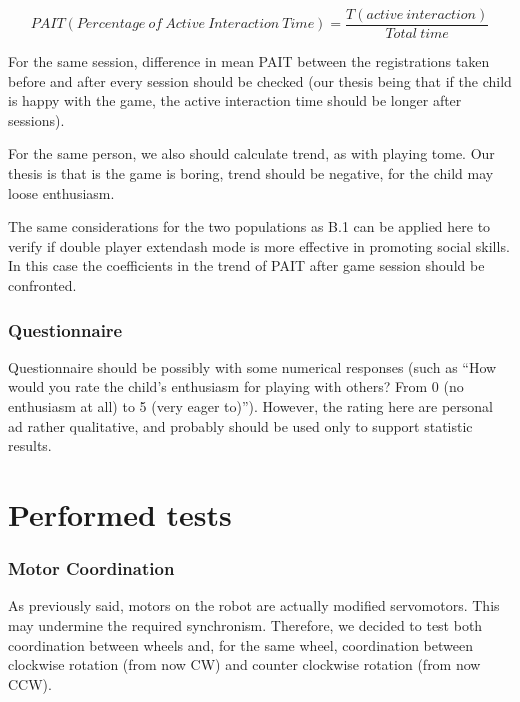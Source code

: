 \documentclass[a4paper,twoside]{book}
\begin{document}
\[PAIT (Percentage\ of\ Active\ Interaction\ Time)=\frac{T(active\ interaction)}{Total\ time}\]

For the same session, difference in mean PAIT between the registrations taken before and after every session should be checked (our thesis being that if the child is happy with the game, the active interaction time should be longer after sessions).

For the same person, we also should calculate trend, as with playing tome. Our thesis is that is the game is boring, trend should be negative, for the child may loose enthusiasm.

The same considerations for the two populations as B.1 can be applied here to verify if double player extendash mode is more effective in promoting social skills. In this case the coefficients in the trend of PAIT after game session should be confronted.

\subsubsection*{Questionnaire}

Questionnaire should be possibly with some numerical responses (such as \textquotedblleft How would you rate the child's enthusiasm for playing with others? From 0 (no enthusiasm at all) to 5 (very eager to)\textquotedblright). However, the rating here are personal ad rather qualitative, and probably should be used only to support statistic results.

\section{Performed tests}

\subsubsection*{Motor Coordination}

As previously said, motors on the robot are actually modified servomotors. This may undermine the required synchronism. Therefore, we decided to test both coordination between wheels and, for the same wheel, coordination between clockwise rotation (from now CW) and counter clockwise rotation (from now CCW). 
\end{document}
